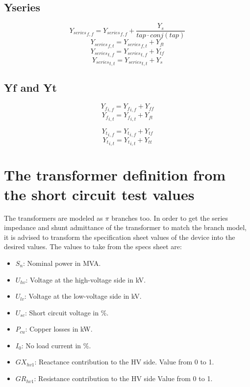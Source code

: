 \documentclass[11pt,fleqn]{book} %
\begin{document}
\subsection{Yseries}

$${Y_{series}}_{f, f} = {Y_{series}}_{f, f}  + \frac{Y_{s}}{tap \cdot conj(tap)}$$
$${Y_{series}}_{f, t} = {Y_{series}}_{f, t} + Y_{ft}$$
$${Y_{series}}_{t, f} = {Y_{series}}_{t, f} + Y_{tf}$$
$${Y_{series}}_{t, t} = {Y_{series}}_{t, t} + Y_{s}$$

\subsection{Yf and Yt}

$${Y_f}_{i, f} = {Y_f}_{i, f} + Y_{ff}$$
$${Y_f}_{i, t} = {Y_f}_{i, t} + Y_{ft}$$

$${Y_t}_{i, f} = {Y_t}_{i, f} + Y_{tf}$$
$${Y_t}_{i, t} = {Y_t}_{i, t} + Y_{tt}$$


\section{The transformer definition from the short circuit test values}

The transformers are modeled as $\pi$ branches too. In order to get the series impedance and shunt admittance of the transformer to match the branch model, it is advised to transform the specification sheet values of the device into the desired values. The values to take from the specs sheet are:
\begin{itemize}
	\item $S_n$: Nominal power in MVA.
	\item $U_{hv}$: Voltage at the high-voltage side in kV.
	\item $U_{lv}$: Voltage at the low-voltage side in kV.
	\item $U_{sc}$: Short circuit voltage in \%.
	\item $P_{cu}$: Copper losses in kW.
	\item $I_0$: No load current in \%.
	\item $GX_{hv1}$: Reactance contribution to the HV side. Value from 0 to 1.
	\item $GR_{hv1}$: Resistance contribution to the HV side Value from 0 to 1.\newline
\end{itemize}
\end{document}
